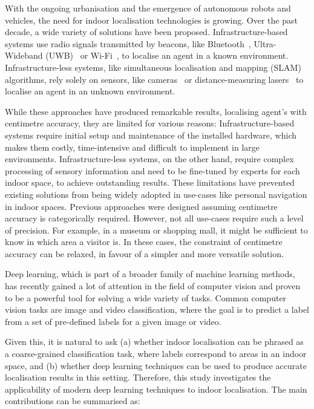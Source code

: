 \documentclass[a4paper]{article}
\begin{document}
With the ongoing urbanisation and the emergence of autonomous robots and
vehicles, the need for indoor localisation technologies is growing. Over the
past decade, a wide variety of solutions have been proposed.
Infrastructure-based systems use radio signals transmitted by beacons, like
Bluetooth~\cite{bluetooth1, bluetooth2}, Ultra-Wideband (UWB)~\cite{uwb1, uwb2}
or Wi-Fi~\cite{survey1, survey2, wireless-positioning}, to localise an agent in
a known environment. Infrastructure-less systems, like simultaneous localisation
and mapping (SLAM) algorithms, rely solely on sensors, like
cameras~\cite{mono-slam, ptam, orb-slam} or distance-measuring
lasers~\cite{lidar-slam} to localise an agent in an unknown environment.

While these approaches have produced remarkable results, localising agent's with
centimetre accuracy, they are limited for various reasons: Infrastructure-based
systems require initial setup and maintenance of the installed hardware, which
makes them costly, time-intensive and difficult to implement in large
environments. Infrastructure-less systems, on the other hand, require complex
processing of sensory information and need to be fine-tuned by experts for each
indoor space, to achieve outstanding results. These limitations have prevented
existing solutions from being widely adopted in use-cases like personal
navigation in indoor spaces. Previous approaches were designed assuming
centimetre accuracy is categorically required. However, not all use-cases
require such a level of precision. For example, in a museum or shopping mall, it
might be sufficient to know in which area a visitor is. In these cases, the
constraint of centimetre accuracy can be relaxed, in favour of a simpler and
more versatile solution.

Deep learning, which is part of a broader family of machine learning methods,
has recently gained a lot of attention in the field of computer vision and
proven to be a powerful tool for solving a wide variety of tasks. Common
computer vision tasks are image and video classification, where the goal is to
predict a label from a set of pre-defined labels for a given image or video. 

Given this, it is natural to ask (a) whether indoor localisation can be phrased
as a coarse-grained classification task, where labels correspond to areas in an
indoor space, and (b) whether deep learning techniques can be used to produce
accurate localisation results in this setting. Therefore, this study
investigates the applicability of modern deep learning techniques to indoor
localisation. The main contributions can be summarised as: 
\end{document}
